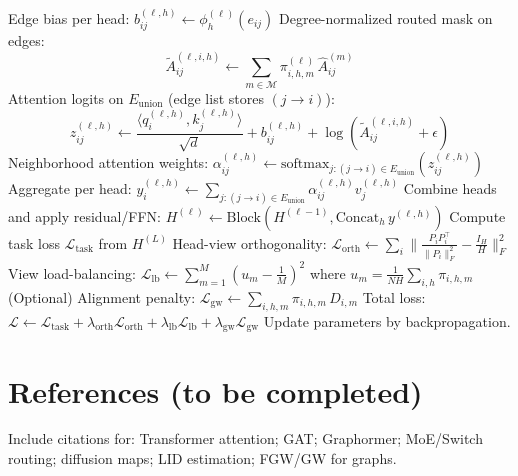 \documentclass[11pt]{article}
\begin{document}
\begin{algorithm}[h]
\begin{algorithmic}[1]
    \State Edge bias per head: $b_{ij}^{(\ell,h)}\gets \phi_h^{(\ell)}(e_{ij})$
    \State Degree-normalized routed mask on edges:
    \[
      \tilde A_{ij}^{(\ell,i,h)} \gets \sum_{m\in\mathcal{M}} \pi_{i,h,m}^{(\ell)} \, \hat A_{ij}^{(m)}
    \]
    \State Attention logits on $E_{\mathrm{union}}$ (edge list stores $(j\to i)$):
    \[
      z_{ij}^{(\ell,h)} \gets \frac{\langle q_i^{(\ell,h)},k_j^{(\ell,h)}\rangle}{\sqrt{d}} + b_{ij}^{(\ell,h)} + \log(\tilde A_{ij}^{(\ell,i,h)}+\epsilon)
    \]
    \State Neighborhood attention weights: $\alpha_{ij}^{(\ell,h)} \gets \mathrm{softmax}_{j:(j\to i)\in E_{\mathrm{union}}}(z_{ij}^{(\ell,h)})$
    \State Aggregate per head: $y_i^{(\ell,h)} \gets \sum_{j:(j\to i)\in E_{\mathrm{union}}} \alpha_{ij}^{(\ell,h)} v_j^{(\ell,h)}$
    \State Combine heads and apply residual/FFN: $H^{(\ell)}\gets \mathrm{Block}(H^{(\ell-1)},\mathrm{Concat}_h\, y^{(\ell,h)})$
\EndFor
\State Compute task loss $\mathcal{L}_{\mathrm{task}}$ from $H^{(L)}$
\State Head-view orthogonality: $\mathcal{L}_{\mathrm{orth}} \gets \sum_i \big\|\frac{P_iP_i^\top}{\|P_i\|_F^2}-\frac{I_H}{H}\big\|_F^2$
\State View load-balancing: $\mathcal{L}_{\mathrm{lb}}\gets \sum_{m=1}^{M}\left(u_m-\frac{1}{M}\right)^2$
\State \hspace{1.5em}where $u_m=\frac{1}{NH}\sum_{i,h}\pi_{i,h,m}$
\State (Optional) Alignment penalty: $\mathcal{L}_{\mathrm{gw}}\gets \sum_{i,h,m}\pi_{i,h,m}\,D_{i,m}$
\State Total loss: $\mathcal{L}\gets \mathcal{L}_{\mathrm{task}} + \lambda_{\mathrm{orth}}\mathcal{L}_{\mathrm{orth}}+\lambda_{\mathrm{lb}}\mathcal{L}_{\mathrm{lb}}+\lambda_{\mathrm{gw}}\mathcal{L}_{\mathrm{gw}}$
\State Update parameters by backpropagation.
\end{algorithmic}
\end{algorithm}

\section*{References (to be completed)}
Include citations for: Transformer attention; GAT; Graphormer; MoE/Switch routing; diffusion maps; LID estimation; FGW/GW for graphs.
\end{document}
